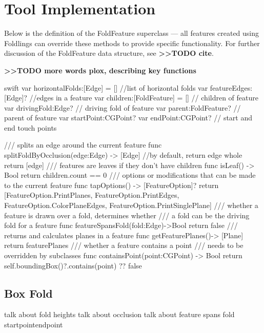 \section{Tool Implementation}\label{tool-implementation}

Below is the definition of the FoldFeature superclass --- all features
created using Foldlings can override these methods to provide specific
functionality. For further discussion of the FoldFeature data structure,
see \textbf{\textgreater{}\textgreater{}TODO cite}.

\textbf{\textgreater{}\textgreater{}TODO more words plox, describing key
functions}

\small
\singlespacing 

\begin{pygmented}{swift}
var horizontalFolds:[Edge] = [] //list of horizontal folds
var featureEdges:[Edge]?        //edges in a feature
var children:[FoldFeature] = [] // children of feature
var drivingFold:Edge? // driving fold of feature
var parent:FoldFeature? // parent of feature
var startPoint:CGPoint?
var endPoint:CGPoint? // start and end touch points

/// splits an edge around the current feature
func splitFoldByOcclusion(edge:Edge) -> [Edge]
{
//by default, return edge whole
return [edge]
}
/// features are leaves if they don't have children
func isLeaf() -> Bool
{
return children.count == 0
}
/// options or modifications that can be made to the current feature
func tapOptions() -> [FeatureOption]?
{
  return [FeatureOption.PrintPlanes, FeatureOption.PrintEdges,
  FeatureOption.ColorPlaneEdges, FeatureOption.PrintSinglePlane]
}
/// whether a feature is drawn over a fold, determines whether 
/// a fold can be the driving fold for a feature
  func featureSpansFold(fold:Edge)->Bool
{
  return false
}
/// returns and calculates planes in a feature
func getFeaturePlanes()-> [Plane]{
  return featurePlanes
}
/// whether a feature contains a point
/// needs to be overridden by subclasses
func containsPoint(point:CGPoint) -> Bool{
  return self.boundingBox()?.contains(point) ?? false
}
\end{pygmented}

\doublespacing
\normalsize

\subsection{Box Fold}\label{box-fold}

talk about fold heights talk about occlusion talk about feature spans
fold startpointendpoint

